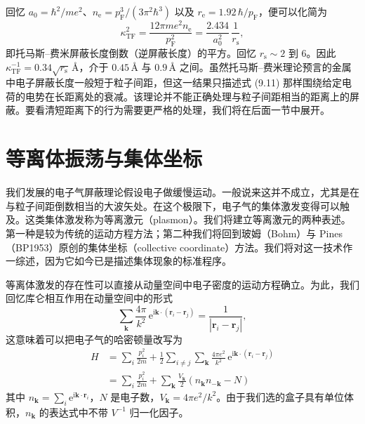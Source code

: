 回忆 $a_0=\hbar^2/me^2$、$n_{\mathrm{e}}=p_{\mathrm{F}}^3/(3\pi^2\hbar^3)$ 以及 $r_{\mathrm{e}}=1.92\,\hbar/p_{\mathrm{F}}$，便可以化简为
\begin{equation*}
\kappa_{\mathrm{TF}}^2=\frac{12\pi me^2n_{\mathrm{e}}}{p_{\mathrm{F}}^2}=\frac{2.434}{a_0^2}\,\frac{1}{r_{\mathrm{s}}},\tag{9.16}
\end{equation*}
即托马斯–费米屏蔽长度倒数（逆屏蔽长度）的平方。回忆 $r_{\mathrm{s}}\sim 2$ 到 6。因此 $\kappa_{\mathrm{TF}}^{-1}=0.34\sqrt{r_{\mathrm{s}}}\,\text{\AA}$，介于 $0.45\,\text{\AA}$ 与 $0.9\,\text{\AA}$ 之间。虽然托马斯–费米理论预言的金属中电子屏蔽长度一般短于粒子间距，但这一结果只描述式 (9.11) 那样围绕给定电荷的电势在长距离处的衰减。该理论并不能正确处理与粒子间距相当的距离上的屏蔽。要看清短距离下的行为需要更严格的处理，我们将在后面一节中展开。

\section{等离体振荡与集体坐标}

我们发展的电子气屏蔽理论假设电子做缓慢运动。一般说来这并不成立，尤其是在与粒子间距倒数相当的大波矢处。在这个极限下，电子气的集体激发变得可以触及。这类集体激发称为等离激元（plasmon）。我们将建立等离激元的两种表述。第一种是较为传统的运动方程方法；第二种我们将回到玻姆（Bohm）与 Pines（BP1953）原创的集体坐标（collective coordinate）方法。我们将对这一技术作一综述，因为它如今已是描述集体现象的标准程序。

等离体激发的存在性可以直接从动量空间中电子密度的运动方程确立。为此，我们回忆库仑相互作用在动量空间中的形式
\begin{equation*}
\sum_{\mathbf{k}}\frac{4\pi}{k^2}\,\mathrm{e}^{\mathrm{i}\mathbf{k}\cdot(\mathbf{r}_i-\mathbf{r}_j)}=\frac{1}{|\mathbf{r}_i-\mathbf{r}_j|},\tag{9.17}
\end{equation*}
这意味着可以把电子气的哈密顿量改写为
\begin{equation*}
\begin{aligned}
H&=\sum_i\frac{p_i^2}{2m}+\frac{1}{2}\sum_{i\neq j}\sum_{\mathbf{k}}\frac{4\pi e^2}{k^2}\,\mathrm{e}^{\mathrm{i}\mathbf{k}\cdot(\mathbf{r}_i-\mathbf{r}_j)}\\
&=\sum_i\frac{p_i^2}{2m}+\sum_{\mathbf{k}}\frac{V_{\mathbf{k}}}{2}\left(n_{\mathbf{k}}n_{-\mathbf{k}}-N\right)
\end{aligned}\tag{9.18}
\end{equation*}
其中 $n_{\mathbf{k}}=\sum_i\mathrm{e}^{\mathrm{i}\mathbf{k}\cdot\mathbf{r}_i}$，$N$ 是电子数，$V_{\mathbf{k}}=4\pi e^2/k^2$。由于我们选的盒子具有单位体积，$n_{\mathbf{k}}$ 的表达式中不带 $V^{-1}$ 归一化因子。

